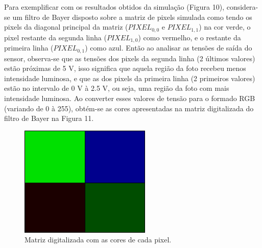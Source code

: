 \documentclass[10pt,a4paper,twocolumn]{article}
\begin{document}
	 Para exemplificar com os resultados obtidos da simulação (Figura 10), considera-se um filtro de Bayer disposto sobre a matriz de pixels simulada como tendo os pixels da diagonal principal da matriz ($PIXEL_{0,0}$ e $PIXEL_{1,1}$) na cor verde, o pixel restante da segunda linha ($PIXEL_{1,0}$) como vermelho, e o restante da primeira linha ($PIXEL_{0,1}$) como azul. Então ao analisar as tensões de saída do sensor, observa-se que as tensões dos pixels da segunda linha (2 últimos valores) estão  próximas de 5 V, isso significa que aquela região da foto recebeu menos intensidade luminosa, e que as dos pixels da primeira linha (2 primeiros valores) estão no intervalo de 0 V à 2.5 V, ou seja, uma região da foto com mais intensidade luminosa. Ao converter esses valores de tensão para o formado RGB (variando de 0 à 255), obtém-se as cores apresentadas na matriz digitalizada do filtro de Bayer na Figura 11.
	 
 	\begin{figure}[!h]
 	\centering
 	\includegraphics[scale=0.4]{imagens/filtro_bayer.png}
 	\caption{Matriz digitalizada com as cores de cada pixel.}
	 \end{figure}
	 
\end{document}
